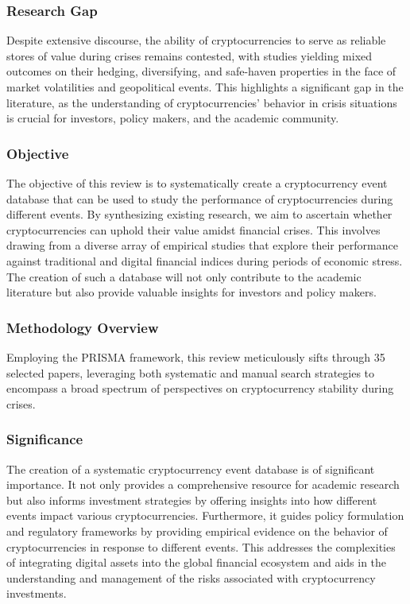 \documentclass{article}
\begin{document}
\subsubsection{Research Gap}

Despite extensive discourse, the ability of cryptocurrencies to serve as reliable stores of value during crises remains contested, with studies yielding mixed outcomes on their hedging, diversifying, and safe-haven properties in the face of market volatilities and geopolitical events. This highlights a significant gap in the literature, as the understanding of cryptocurrencies' behavior in crisis situations is crucial for investors, policy makers, and the academic community.

\subsubsection{Objective}

The objective of this review is to systematically create a cryptocurrency event database that can be used to study the performance of cryptocurrencies during different events. By synthesizing existing research, we aim to ascertain whether cryptocurrencies can uphold their value amidst financial crises. This involves drawing from a diverse array of empirical studies that explore their performance against traditional and digital financial indices during periods of economic stress. The creation of such a database will not only contribute to the academic literature but also provide valuable insights for investors and policy makers.

\subsubsection{Methodology Overview}

Employing the PRISMA framework, this review meticulously sifts through 35 selected papers, leveraging both systematic and manual search strategies to encompass a broad spectrum of perspectives on cryptocurrency stability during crises.



\subsubsection{Significance}

The creation of a systematic cryptocurrency event database is of significant importance. It not only provides a comprehensive resource for academic research but also informs investment strategies by offering insights into how different events impact various cryptocurrencies. Furthermore, it guides policy formulation and regulatory frameworks by providing empirical evidence on the behavior of cryptocurrencies in response to different events. This addresses the complexities of integrating digital assets into the global financial ecosystem and aids in the understanding and management of the risks associated with cryptocurrency investments.
\end{document}
